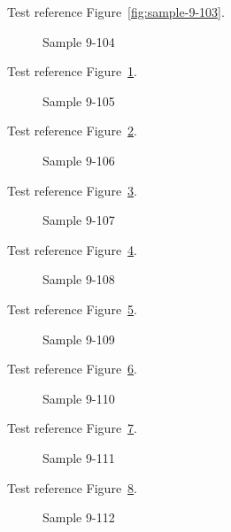 Test reference Figure~\ref{fig:sample-9-103}.

\begin{figure}[tbhp]
\caption{Sample 9-104}
\label{fig:sample-9-104}
\end{figure}

Test reference Figure~\ref{fig:sample-9-104}.

\begin{figure}[tbhp]
\caption{Sample 9-105}
\label{fig:sample-9-105}
\end{figure}

Test reference Figure~\ref{fig:sample-9-105}.

\begin{figure}[tbhp]
\caption{Sample 9-106}
\label{fig:sample-9-106}
\end{figure}

Test reference Figure~\ref{fig:sample-9-106}.

\begin{figure}[tbhp]
\caption{Sample 9-107}
\label{fig:sample-9-107}
\end{figure}

Test reference Figure~\ref{fig:sample-9-107}.

\begin{figure}[tbhp]
\caption{Sample 9-108}
\label{fig:sample-9-108}
\end{figure}

Test reference Figure~\ref{fig:sample-9-108}.

\begin{figure}[tbhp]
\caption{Sample 9-109}
\label{fig:sample-9-109}
\end{figure}

Test reference Figure~\ref{fig:sample-9-109}.

\begin{figure}[tbhp]
\caption{Sample 9-110}
\label{fig:sample-9-110}
\end{figure}

Test reference Figure~\ref{fig:sample-9-110}.

\begin{figure}[tbhp]
\caption{Sample 9-111}
\label{fig:sample-9-111}
\end{figure}

Test reference Figure~\ref{fig:sample-9-111}.

\begin{figure}[tbhp]
\caption{Sample 9-112}
\label{fig:sample-9-112}
\end{figure}

